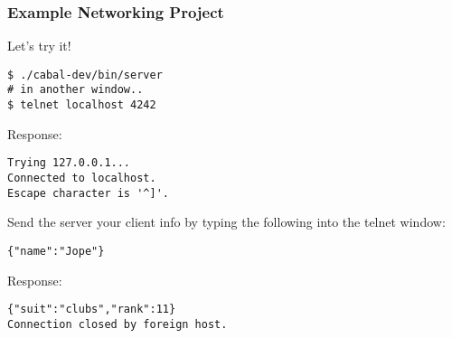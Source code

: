 \documentclass{beamer}
\begin{document}
\begin{frame}[fragile]
\frametitle{Example Networking Project}

Let's try it!

{\small
\begin{verbatim}
$ ./cabal-dev/bin/server
# in another window..
$ telnet localhost 4242
\end{verbatim}
}

Response:

{\small
\begin{verbatim}
Trying 127.0.0.1...
Connected to localhost.
Escape character is '^]'.
\end{verbatim}
}

Send the server your client info by typing the following into the telnet window:

{\small
\begin{verbatim}
{"name":"Jope"}
\end{verbatim}
}

Response:

{\small
\begin{verbatim}
{"suit":"clubs","rank":11}
Connection closed by foreign host.
\end{verbatim}
}

\end{frame}
\end{document}
